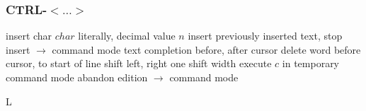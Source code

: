 \subsubsection{CTRL-$<\ldots>$}{}
	{insert char $char$ literally, decimal value $n$}
	{insert previously inserted text, stop insert $\to$ command mode}
	{text completion before, after cursor}
	{delete word before cursor, to start of line}
	{shift left, right one shift width}
	{execute $c$ in temporary command mode}
	{abandon edition $\to$ command mode}


\copyrightnotice

\vfil
\supereject
\if L\lr \else\null\vfill\eject\fi
\bye

